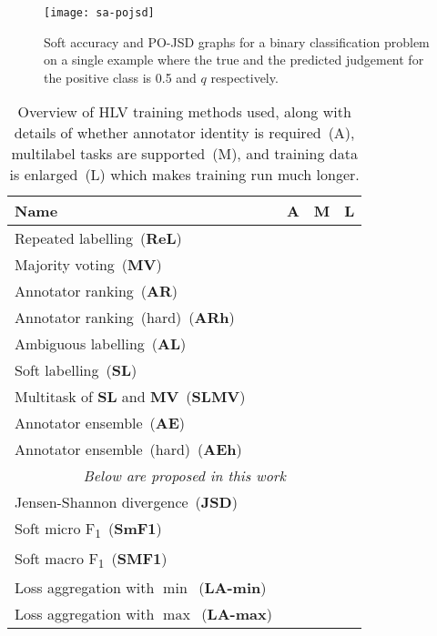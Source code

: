 \documentclass[shortpaper]{clv2025}
\newcommand{\pojsd}{PO-JSD\xspace}
\newcommand{\methname}[1]{\textbf{#1}}  %
\newcommand{\yes}{\textcolor{green}{\ding{51}}\xspace}
\newcommand{\no}{\textcolor{red}{\ding{55}}\xspace}
\begin{document}
\begin{figure}
  \centering
  \texttt{[image: sa-pojsd]}
  \caption{Soft accuracy and \pojsd graphs for a binary classification problem
    on a single example where the true and the predicted judgement for the
    positive class is 0.5 and $q$ respectively.}\label{fig:sa-pojsd}
\end{figure}

\begin{table}
  \caption{Overview of HLV training methods used, along with details of whether
    annotator identity is required~(A), multilabel tasks are supported~(M), and
    training data is enlarged~(L) which makes training run much
    longer.}\label{tbl:train-meths}
  \begin{tabular}{@{}lccc@{}}
    \toprule
    Name                                                           & A    & M    & L    \\
    \midrule
    Repeated labelling~(\methname{ReL})                            & \no  & \yes & \yes \\
    Majority voting~(\methname{MV})                                & \no  & \yes & \no  \\
    Annotator ranking~(\methname{AR})                              & \yes & \yes & \no  \\
    Annotator ranking~(hard)~(\methname{ARh})                      & \yes & \yes & \no  \\
    Ambiguous labelling~(\methname{AL})                            & \no  & \no  & \yes \\
    Soft labelling~(\methname{SL})                                 & \no  & \yes & \no  \\
    Multitask of \methname{SL} and \methname{MV}~(\methname{SLMV}) & \no  & \yes & \no  \\
    Annotator ensemble~(\methname{AE})                             & \yes & \yes & \no  \\
    Annotator ensemble~(hard)~(\methname{AEh})                     & \yes & \yes & \no  \\
    \cmidrule{1-4}
    \multicolumn{4}{c}{\textit{Below are proposed in this work}}                        \\
    \cmidrule{1-4}
    Jensen-Shannon divergence~(\methname{JSD})                     & \no  & \yes & \no  \\
    Soft micro F\textsubscript{1}~(\methname{SmF1})                & \no  & \yes & \no  \\
    Soft macro F\textsubscript{1}~(\methname{SMF1})                & \no  & \yes & \no  \\
    Loss aggregation with $\min$~(\methname{LA-min})               & \no  & \yes & \no  \\
    Loss aggregation with $\max$~(\methname{LA-max})               & \no  & \yes & \no  \\
    \bottomrule
  \end{tabular}
\end{table}
\end{document}
